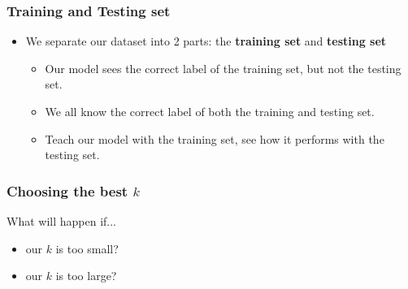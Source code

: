\documentclass[aspectratio=169]{beamer}
\begin{document}
\begin{frame}
	\frametitle{Training and Testing set}
	\begin{figure}
	\end{figure}
	\begin{itemize}
		\item<2-> We separate our dataset into 2 parts: the \textbf{training set} and \textbf{testing set}
			\begin{itemize}
				\item<3-> Our model sees the correct label of the training set, but not the testing set.
				\item<4-> We all know the correct label of both the training and testing set.
				\item<5-> Teach our model with the training set, see how it performs with the testing set.
			\end{itemize}
	\end{itemize}
\end{frame}

\begin{frame}
	\frametitle{Choosing the best $k$}
	What will happen if...

	\begin{itemize}
		\item our $k$ is too small?
		\item our $k$ is too large?
	\end{itemize}
\end{frame}
\end{document}
